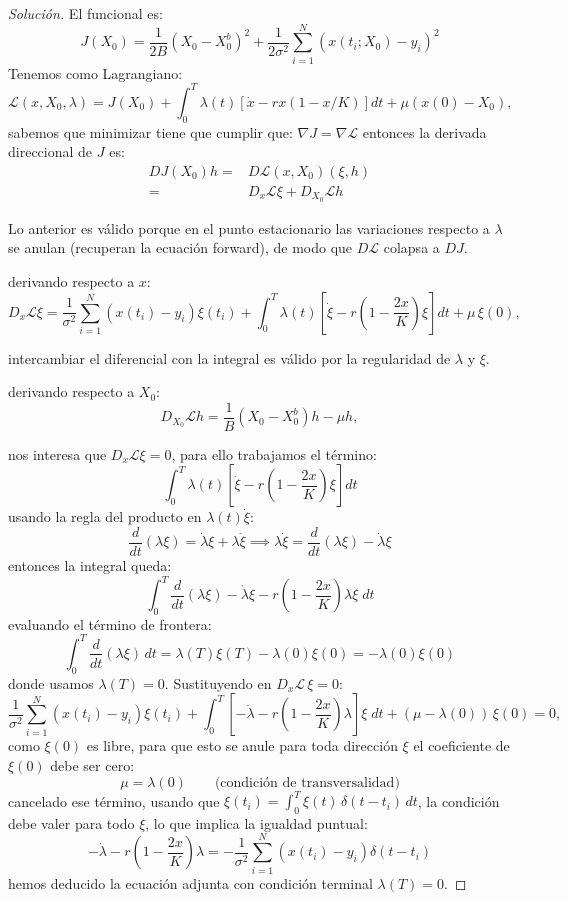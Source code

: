 \documentclass[12pt,spanish,mexico]{article}
\numberwithin{equation}{section}
\theoremstyle{definition}
\theoremstyle{remark}
\newenvironment{solution}{\begin{proof}[Solución]}{\end{proof}}
\begin{document}
\begin{solution}
El funcional es:
\[
J(X_0) = \frac{1}{2B}(X_0 - X_0^b)^2 + \frac{1}{2\sigma^2} \sum_{i=1}^N (x(t_i; X_0) - y_i)^2
\]
Tenemos como Lagrangiano:
\[
\mathcal{L}(x, X_0, \lambda) = J(X_0) + \int_0^T \lambda(t) \left[ \dot{x} - r x(1 - x/K) \right] dt + \mu(x(0) - X_0), 
\]
sabemos que minimizar tiene que cumplir que: 
$\nabla J= \nabla \mathcal{L}$
entonces la derivada direccional de $J$ es:
\begin{align*}
D J(X_0)h =& D \mathcal{L}(x,X_0)(\xi,h) \\
=& D_x \mathcal{L} \xi+D_{X_0} \mathcal{L} h
\end{align*}


Lo anterior es válido porque en el punto estacionario las variaciones respecto a $\lambda$ se anulan (recuperan la ecuación forward), de modo que $D\mathcal{L}$ colapsa a $DJ$.

derivando respecto a $x$:
\[
D_x \mathcal{L} \xi = \frac{1}{\sigma^2} \sum_{i=1}^N (x(t_i) - y_i) \xi(t_i)+  \int_0^T \lambda(t) \left[ \dot{\xi}-r\left(1 -\frac{2x}{K} \right)\xi \right] dt + \mu\,\xi(0),
\]

intercambiar el diferencial con la integral es válido por la regularidad de $\lambda$ y $\xi$.

derivando respecto a $X_0$:
\[
D_{X_0} \mathcal{L} h= \frac{1}{B}(X_0 - X_0^b)h - \mu h, 
\]

nos interesa que $D_x \mathcal{L} \xi=0$, para ello trabajamos el término:
\[
\int_0^T \lambda(t) \left[ \dot{\xi}-r\left(1 -\frac{2x}{K} \right)\xi \right] dt 
\]
usando la regla del producto en $\lambda(t)\dot{\xi}$:
\[
\frac{d}{dt}(\lambda \xi)=\dot{\lambda} \xi+\lambda \dot{\xi}
\implies
\lambda \dot{\xi}=\frac{d}{dt}(\lambda \xi)-\dot{\lambda} \xi
\]
entonces la integral queda:
\[
\int_0^T \frac{d}{dt}(\lambda \xi)-\dot{\lambda} \xi-r\left(1 -\frac{2x}{K} \right)\lambda \xi \;  dt 
\]
evaluando el término de frontera:
\[
\int_0^T \frac{d}{dt}(\lambda \xi)\, dt=\lambda(T)\xi(T)-\lambda(0)\xi(0)=-\lambda(0)\xi(0)
\]
donde usamos $\lambda(T)=0$. Sustituyendo en $D_x\mathcal{L}\,\xi = 0$:
\[
\frac{1}{\sigma^2} \sum_{i=1}^N (x(t_i) - y_i) \xi(t_i)+\int_0^T\left[-\dot{\lambda} -r\left(1 -\frac{2x}{K} \right)\lambda\right] \xi \;  dt + (\mu - \lambda(0))\,\xi(0)= 0, 
\]
como $\xi(0)$ es libre, para que esto se anule para toda dirección $\xi$ el coeficiente de $\xi(0)$ debe ser cero:
\[
\mu = \lambda(0) \qquad \text{(condición de transversalidad)}
\]
cancelado ese término, usando que $\xi(t_i)=\int_0^T \xi(t)\,\delta(t-t_i)\,dt$, la condición debe valer para todo $\xi$, lo que implica la igualdad puntual:
\[
-\dot{\lambda}-r\left(1 -\frac{2x}{K} \right)\lambda=- \frac{1}{\sigma^2} \sum_{i=1}^N (x(t_i) - y_i) \delta (t-t_i)
\]
hemos deducido la ecuación adjunta con condición terminal $\lambda(T)=0$.
\end{solution}
\end{document}
